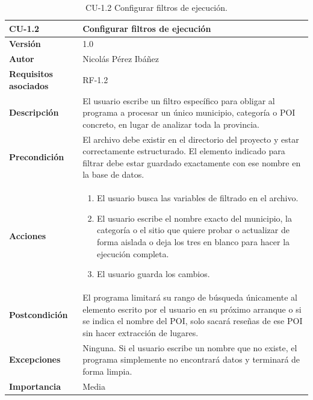\begin{table}[p]
	\centering
	\begin{tabularx}{\linewidth}{ p{} p{} }
		\toprule
		\textbf{CU-1.2}    & \textbf{Configurar filtros de ejecución}\\
		\toprule
		\textbf{Versión}              & 1.0    \\
		\textbf{Autor}                & Nicolás Pérez Ibáñez \\
		\textbf{Requisitos asociados} & RF-1.2 \\
		\textbf{Descripción}          & El usuario escribe un filtro específico para obligar al programa a procesar un único municipio, categoría o POI concreto, en lugar de analizar toda la provincia. \\
		\textbf{Precondición}         & El archivo \ruta{config/config.json} debe existir en el directorio del proyecto y estar correctamente estructurado. El elemento indicado para filtrar debe estar guardado exactamente con ese nombre en la base de datos. \\
		\textbf{Acciones}             &
		\begin{enumerate}
			\def\labelenumi{\arabic{enumi}.}
			\tightlist
			\item El usuario busca las variables de filtrado en el archivo.
			\item El usuario escribe el nombre exacto del municipio, la categoría o el sitio que quiere probar o actualizar de forma aislada o deja los tres en blanco para hacer la ejecución completa.
			\item El usuario guarda los cambios.
		\end{enumerate}\\
		\textbf{Postcondición}        & El programa limitará su rango de búsqueda únicamente al elemento escrito por el usuario en su próximo arranque o si se indica el nombre del POI, solo sacará reseñas de ese POI sin hacer extracción de lugares. \\
		\textbf{Excepciones}          & Ninguna. Si el usuario escribe un nombre que no existe, el programa simplemente no encontrará datos y terminará de forma limpia. \\
		\textbf{Importancia}          & Media \\
		\bottomrule
	\end{tabularx}
	\caption{CU-1.2 Configurar filtros de ejecución.}
\end{table}

